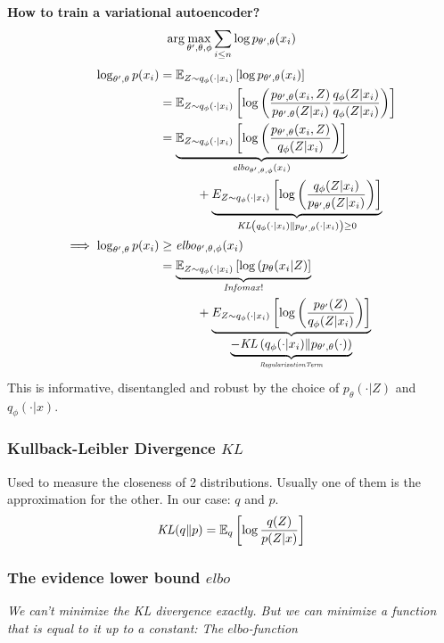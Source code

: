 \textbf{How to train a variational autoencoder? }
$$
	\arg\max_{\theta', \theta, \phi} \sum_{i\leq n} \log p_{\theta', \theta}(x_i)
$$
{\footnotesize
\begin{align*}
	\log_{\theta', \theta}p(x_i) 	&= \mathbb E_{Z\sim q_\phi(\cdot| x_i)}\left[\log p_{\theta', \theta}(x_i)\right] \\
									&= \mathbb E_{Z\sim q_\phi(\cdot| x_i)}\left[\log \left(\frac{p_{\theta', \theta}(x_i, Z)}{p_{\theta'. \theta}(Z| x_i)}\frac{q_\phi(Z| x_i)}{q_\phi(Z| x_i)} \right)\right] \\
									&= \underbrace{\mathbb E_{Z\sim q_\phi(\cdot| x_i)}\left[\log \left(\frac{p_{\theta', \theta}(x_i, Z)}{q_\phi(Z| x_i)} \right)\right]}_{\mathit{elbo}_{\theta', \theta, \phi}(x_i)} \\
									&\quad\quad\quad  + \underbrace{E_{Z\sim q_\phi(\cdot| x_i)}\left[\log \left(\frac{q_\phi(Z| x_i)}{p_{\theta', \theta}(Z| x_i)} \right)\right] }_{\mathit{KL}\left(q_\phi(\cdot| x_i)\| p_{\theta', \theta}(\cdot| x_i)\right) \geq 0} \\
	\implies \log_{\theta', \theta}p(x_i) 
									&\geq \mathit{elbo}_{\theta', \theta, \phi}(x_i) \\
									&= \underbrace{\mathbb E_{Z\sim q_\phi(\cdot| x_i)}\left[\log \left(p_\theta(x_i| Z\right)\right]}_{\mathit{Infomax!}} \\
									&\quad\quad\quad  + \underbrace{E_{Z\sim q_\phi(\cdot| x_i)}\left[\log 
											\left(\frac{p_{\theta'}(Z)}{q_{\phi}(Z| x_i)} \right)\right] }_{\underbrace{\mathit{-KL}\left(q_\phi(\cdot| x_i)\| p_{\theta', \theta}(\cdot)\right) }_{\mathit{Regularization Term}}}  
\end{align*}
}
This is informative, disentangled and robust by the choice of $p_\theta(\cdot | Z)$ and $q_\phi(\cdot | x)$.
\subsubsection{Kullback-Leibler Divergence $\mathit{KL}$}
Used to measure the closeness of 2 distributions. Usually one of them is the approximation for the other. In our case: $q$ and $p$.
$$
	\mathit{KL}(q\|p) = \mathbb E_q\left[\log\frac{q(Z)}{p(Z|x)} \right]
$$
\subsubsection{The evidence lower bound $\mathit{elbo}$}
\textit{We can't minimize the KL divergence exactly. But we can minimize a function that is equal to it up to a constant: The $\mathit{elbo}$-function}

